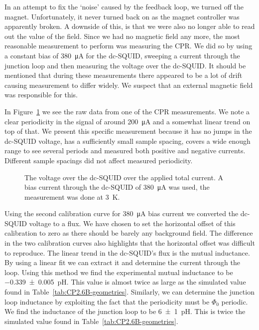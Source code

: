 In an attempt to fix the `noise' caused by the feedback loop, we turned off the magnet. Unfortunately, it never turned back on as the magnet controller was apparently broken. A downside of this, is that we were also no longer able to read out the value of the field. Since we had no magnetic field any more, the most reasonable measurement to perform was measuring the CPR. We did so by using a constant bias of \qty{380}{\micro\ampere} for the dc-SQUID, sweeping a current through the junction loop and then measuring the voltage over the dc-SQUID. It should be mentioned that during these measurements there appeared to be a lot of drift causing measurement to differ widely. We suspect that an external magnetic field was responsible for this. 

In Figure~\ref{fig:CP2.6B_SQUID_voltage_over_total_current} we see the raw data from one of the CPR measurements. We note a clear periodicity in the signal of around \qty{200}{\micro\ampere} and a somewhat linear trend on top of that. We present this specific measurement because it has no jumps in the dc-SQUID voltage, has a sufficiently small sample spacing, covers a wide enough range to see several periods and measured both positive and negative currents. Different sample spacings did not affect measured periodicity.

\begin{figure}[ht!]
	\centering
	
	\caption{The voltage over the dc-SQUID over the applied total current. A bias current through the dc-SQUID of \qty{380}{\micro\ampere} was used, the measurement was done at \qty{3}{\kelvin}.}
	\label{fig:CP2.6B_SQUID_voltage_over_total_current}
\end{figure}

Using the second calibration curve for \qty{380}{\micro\ampere} bias current we converted the dc-SQUID voltage to a flux. We have chosen to set the horizontal offset of this calibration to zero as there should be barely any background field. The difference in the two calibration curves also highlights that the horizontal offset was difficult to reproduce. The linear trend in the dc-SQUID's flux is the mutual inductance. By using a linear fit we can extract it and determine the current through the loop. Using this method we find the experimental mutual inductance to be \qty{-0.339\pm0.005}{\pico\henry}. This value is almost twice as large as the simulated value found in Table~\ref{tab:CP2.6B-geometries}. Similarly, we can determine the junction loop inductance by exploiting the fact that the periodicity must be $\Phi_0$ periodic. We find the inductance of the junction loop to be \qty{6\pm1}{\pico\henry}. This is twice the simulated value found in Table~\ref{tab:CP2.6B-geometries}.

